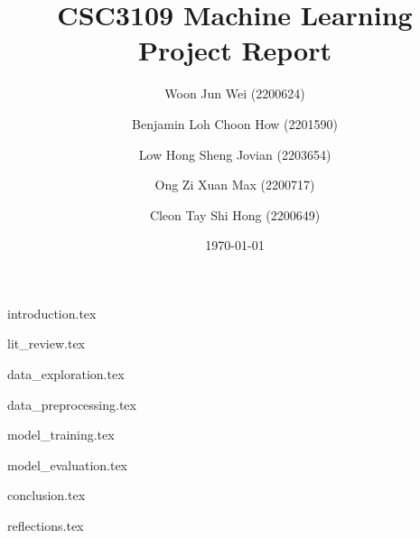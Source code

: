 \documentclass[
	article, %
	10pt, %
]{CSUniSchoolLabReport}
\title{CSC3109 Machine Learning Project Report} %
\author[1]{Woon Jun Wei (2200624)}
\author[1]{Benjamin Loh Choon How (2201590)}
\author[1]{Low Hong Sheng Jovian (2203654)}
\author[1]{Ong Zi Xuan Max (2200717)}
\author[1]{Cleon Tay Shi Hong (2200649)}
\affil[1]{Team 19}
\date{\today} %
\begin{document}
\maketitle %

\pagebreak
\begin{spacing}{0.8}
\tableofcontents 
\end{spacing}
\pagebreak

{introduction.tex}

{lit_review.tex}

{data_exploration.tex}


{data_preprocessing.tex}

{model_training.tex}

{model_evaluation.tex}

{conclusion.tex}

{reflections.tex}



\end{document}
